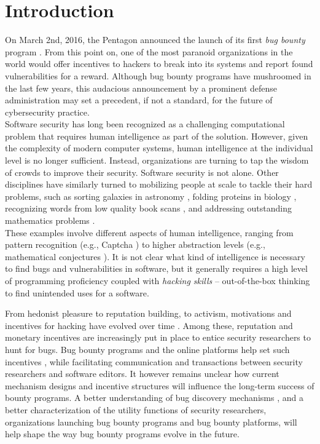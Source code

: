 \section{Introduction}
\label{sec:intro}
On March 2nd, 2016, the Pentagon announced the launch of its first {\it bug bounty} program \cite{Pentagon}. From this point on, one of the most paranoid organizations in the world would offer incentives to hackers to break into its systems and report found vulnerabilities for a reward. Although bug bounty programs have mushroomed in the last few years, this audacious announcement by a prominent defense administration may set a precedent, if not a standard, for the future of cybersecurity practice.\\ 

Software security has long been recognized as a challenging computational problem \cite{adams1984textordfeminineoptimizing} that requires human intelligence as part of the solution. However, given the complexity of modern computer systems, human intelligence at the individual level is no longer sufficient. Instead, organizations are turning to tap the wisdom of crowds \cite{surowiecki2005wisdom} to improve their security. Software security is not alone. Other disciplines have similarly turned to mobilizing people at scale to tackle their hard problems, such as sorting galaxies in astronomy \cite{smith2013introduction}, folding proteins in biology \cite{khatib2011algorithm}, recognizing words from low quality book scans \cite{von2003captcha}, and addressing outstanding mathematics problems \cite{gowers2009massively,cranshaw2011polymath}.\\

These examples involve different aspects of human intelligence, ranging from pattern recognition (e.g., Captcha \cite{von2003captcha}) to higher abstraction levels (e.g., mathematical conjectures \cite{gowers2009massively,cranshaw2011polymath}). It is not clear what kind of intelligence is necessary to find bugs and vulnerabilities in software, but it generally requires a high level of programming proficiency coupled with {\it hacking skills} -- out-of-the-box thinking to find unintended uses for a software. 

From hedonist pleasure to reputation building, to activism, motivations and incentives for hacking have evolved over time \cite{Levy84}. Among these, reputation and monetary incentives are increasingly put in place to entice security researchers to hunt for bugs. Bug bounty programs and the online platforms help set such incentives \cite{bohme2006comparison,finifter2013empirical,zhao2014exploratory,zhao2015empirical}, while facilitating communication and transactions between security researchers and software editors. It however remains unclear how current mechanism designs and incentive structures will influence the long-term success of bounty programs. A better understanding of bug discovery mechanisms \cite{bishop1996conservative,brady1999murphy,zhao2016empirical}, and a better characterization of the utility functions of security researchers, organizations launching bug bounty programs and bug bounty platforms, will help shape the way bug bounty programs evolve in the  future.\\

